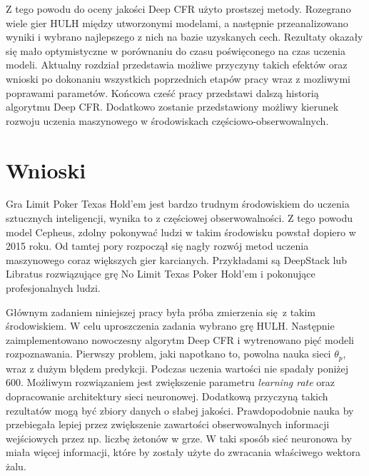\documentclass[12pt,oneside,a4paper]{report}
\begin{document}
 
Z tego powodu do oceny jakości Deep CFR użyto prostszej metody.
Rozegrano wiele gier HULH między utworzonymi modelami, a następnie przeanalizowano wyniki
i wybrano
najlepszego z nich na bazie uzyskanych cech. Rezultaty okazały się mało optymistyczne w porównaniu
do czasu poświęconego na czas uczenia modeli.
Aktualny rozdział przedstawia możliwe przyczyny takich efektów oraz wnioski po dokonaniu wszystkich poprzednich etapów
pracy wraz z
mozliwymi poprawami parametów. Końcowa cześć pracy przedstawi dalszą historią algorytmu Deep CFR.
Dodatkowo zostanie przedstawiony 
możliwy
kierunek rozwoju uczenia maszynowego w środowiskach częściowo-obserwowalnych.





\section{Wnioski}

Gra Limit Poker Texas Hold'em jest bardzo trudnym środowiskiem do uczenia sztucznych
inteligencji, wynika to z częściowej obserwowalności. 
Z tego powodu model Cepheus, zdolny pokonywać ludzi w takim środowisku powstał 
dopiero w 2015 roku. Od tamtej pory rozpoczął się nagły rozwój metod uczenia maszynowego 
coraz większych gier 
karcianych.
Przykładami są DeepStack lub Libratus rozwiązujące grę No Limit Texas Poker Hold'em i pokonujące
profesjonalnych ludzi.

Głównym zadaniem niniejszej pracy była próba zmierzenia się z takim środowiskiem. W celu uproszczenia
zadania wybrano grę HULH. Następnie zaimplementowano 
nowoczesny algorytm Deep CFR i wytrenowano pięć modeli
rozpoznawania. Pierwszy problem, jaki napotkano to, powolna nauka sieci $\theta_{p}$,
wraz z dużym błędem predykcji. Podczas uczenia wartości nie spadały poniżej 600.
Możliwym rozwiązaniem jest zwiększenie parametru \emph{learning rate} oraz
dopracowanie architektury sieci neuronowej. Dodatkową przyczyną takich rezultatów mogą być
zbiory danych o słabej jakości. Prawdopodobnie nauka by przebiegała lepiej przez zwiększenie
zawartości obserwowalnych informacji wejściowych przez np. liczbę żetonów w grze. W taki sposób
sieć neuronowa by miała więcej informacji, które by zostały użyte do zwracania właściwego 
wektora żalu.
\end{document}
